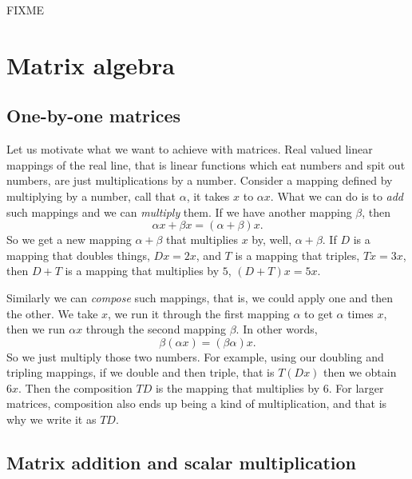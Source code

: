 FIXME




\sectionnewpage
\section{Matrix algebra}
\label{matalg:section}


\subsection{One-by-one matrices}

Let us motivate what we want to achieve with matrices.
Real valued linear mappings of the real line, that is linear functions
which eat numbers and spit out numbers, are just multiplications by a
number.  Consider a mapping defined by multiplying by a
number, call that $\alpha$, it takes $x$ to $\alpha x$.  What we can do is
to \emph{add} such mappings and we can \emph{multiply} them.
If we have another mapping $\beta$, then
\begin{equation*}
\alpha x + \beta x = (\alpha + \beta) x .
\end{equation*}
So we get a new mapping $\alpha+\beta$ that multiplies $x$ by, well,
$\alpha+\beta$.  If $D$ is a mapping that doubles things, 
$Dx = 2x$, and $T$ is a mapping that triples, $Tx = 3x$, then
$D+T$ is a mapping that multiplies by $5$, $(D+T)x = 5x$.

Similarly we can \emph{compose} such mappings, that
is, we could apply one and then the other.  We take $x$, we run it through
the first mapping $\alpha$ to get $\alpha$ times $x$, then we run
$\alpha x$ through the second mapping $\beta$.  In other words,
\begin{equation*}
\beta ( \alpha x ) = (\beta \alpha) x .
\end{equation*}
So we just multiply those two numbers.  For example, using our doubling
and tripling mappings, if we double and then triple, that is $T(Dx)$ then
we obtain $6x$.  Then the composition $TD$ is the mapping that multiplies
by $6$.  For larger matrices, composition also ends up being a kind of
multiplication, and that is why we write it as $TD$.

\subsection{Matrix addition and scalar multiplication}

